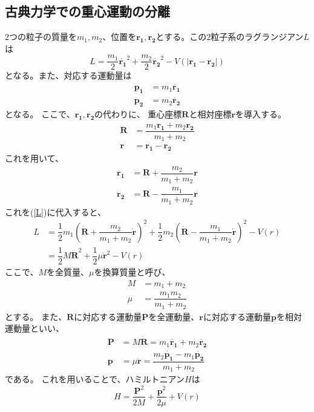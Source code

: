 \documentclass[dvipdfmx,a4paper,16pt]{jsarticle}
\begin{document}
\subsection{古典力学での重心運動の分離}
$2$つの粒子の質量を$m_1, m_2$、位置を$\bm{r_1},\bm{r_2}$とする。この$2$粒子系のラグランジアン$L$は
\begin{equation}
	\label{L}
	L = \dfrac{m_1}{2}\dot{\bm{r_1}}^2 + \dfrac{m_2}{2}\dot{\bm{r_2}}^2 - V(|\bm{r_1} - \bm{r_2}|)
\end{equation}
となる。また、対応する運動量は
\begin{align}
	\bm{p_1} &= m_1\dot{\bm{r_1}} \\
	\bm{p_2} &= m_2\dot{\bm{r_2}}
\end{align}
となる。
ここで、$\bm{r_1},\bm{r_2}$の代わりに、
重心座標$\bm{R}$と相対座標$\bm{r}$を導入する。
\begin{align}
	\label{CM_R}
	\bm{R} &= \dfrac{m_1\bm{r_1} + m_2\bm{r_2}}{m_1 + m_2} \\
	\label{rel_r}
	\bm{r} &= \bm{r_1} - \bm{r_2}
\end{align}
これを用いて、
\begin{align}
	\bm{r_1} &= \bm{R} + \dfrac{m_2}{m_1 + m_2}\bm{r} \\
	\bm{r_2} &= \bm{R} - \dfrac{m_1}{m_1 + m_2}\bm{r}
\end{align}
これを(\ref{L})に代入すると、
\begin{align}
	L &= \dfrac{1}{2}m_1\left( \dot{\bm{R}} + \dfrac{m_2}{m_1 + m_2}\dot{\bm{r}} \right)^2
		+ \dfrac{1}{2}m_2\left( \dot{\bm{R}} - \dfrac{m_1}{m_1 + m_2}\dot{\bm{r}} \right)^2
		- V(r) \\
		&= \dfrac{1}{2}M\dot{\bm{R}}^2 + \dfrac{1}{2}\mu\dot{\bm{r}}^2 - V(r)
\end{align}
ここで、$M$を全質量、$\mu$を換算質量と呼び、
\begin{align}
	M &= m_1 + m_2 \\
	\mu &= \dfrac{m_1m_2}{m_1+m_2}
\end{align}
とする。
また、$\bm{R}$に対応する運動量$\bm{P}$を全運動量、$\bm{r}$に対応する運動量$\bm{p}$を相対運動量といい、
\begin{align}
	\label{CM_P}
	\bm{P} &= M\dot{\bm{R}} = m_1\dot{\bm{r_1}} + m_2\dot{\bm{r_2}} \\
	\label{rel_p}
	\bm{p} &= \mu\dot{\bm{r}} = \dfrac{m_2\dot{\bm{p_1}} - m_1\dot{\bm{p_2}}}{m_1 + m_2}
\end{align}
である。
これを用いることで、ハミルトニアン$H$は
\begin{equation}
	H = \dfrac{\bm{P}^2}{2M} + \dfrac{\bm{p}^2}{2\mu} + V(r)
\end{equation}
\end{document}
